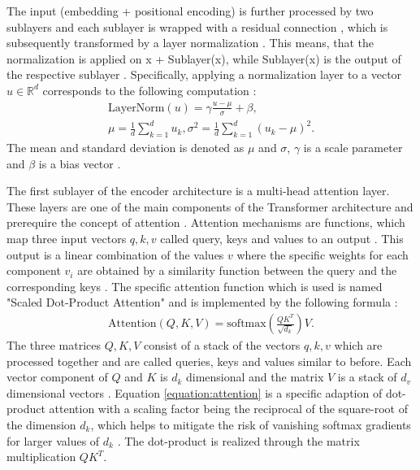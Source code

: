 \par
The input (embedding + positional encoding) is further processed by two sublayers and each sublayer is wrapped with a residual connection \citep{He2016}, which is subsequently transformed by a layer normalization \citep{Ba2016}.
This means, that the normalization is applied on x + Sublayer(x), while Sublayer(x) is the output of the respective sublayer \citep{Vaswani2017}.
Specifically, applying a normalization layer to a vector $u\in \mathbb{R}^d$ corresponds to the following computation \citep{Ba2016,Xiong2020}:
\begin{align}
	\text{LayerNorm}(u) = \gamma \frac{u-\mu}{\sigma}+\beta,\\
	\mu = \frac{1}{d}\sum_{k=1}^{d}u_k, \sigma^2 = \frac{1}{d}\sum_{k=1}^{d}(u_k - \mu)^2.
\end{align}
The mean and standard deviation is denoted as $\mu$ and $\sigma$, $\gamma$ is a scale parameter and $\beta$ is a bias vector \citep{Xiong2020}.
\par
The first sublayer of the encoder architecture is a multi-head attention layer.   
These layers are one of the main components of the Transformer architecture and prerequire the concept of attention \citep{Vaswani2017}.
Attention mechanisms are functions, which map three input vectors $q,k,v$ called query, keys and values to an output \citep{Vaswani2017}.
This output is a linear combination of the values $v$ where the specific weights for each component $v_i$ are obtained by a similarity function between the query and the corresponding keys \citep{Vaswani2017}.
The specific attention function which is used is named "Scaled Dot-Product Attention" and is implemented by the following formula \citep{Vaswani2017}:
\begin{align}
    \text{Attention}(Q,K,V) = \text{softmax}(\frac{QK^T}{\sqrt{d_k}})V.
	\label{equation:attention}
\end{align}
The three matrices $Q,K,V$ consist of a stack of the vectors $q,k,v$ which are processed together and are called queries, keys and values similar to before.
Each vector component of $Q$ and $K$ is $d_k$ dimensional and the matrix $V$ is a stack of $d_v$ dimensional vectors \citep{Vaswani2017}.
Equation \ref{equation:attention} is a specific adaption of dot-product attention with a scaling factor being the reciprocal of the square-root of the dimension $d_k$, which helps to mitigate the risk of vanishing softmax gradients for larger values of $d_k$ \citep{Vaswani2017}.
The dot-product is realized through the matrix multiplication $QK^T$.
